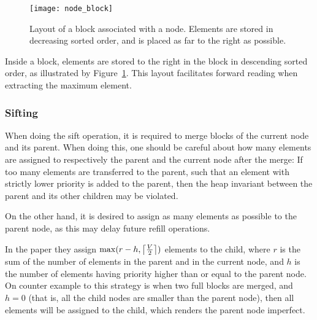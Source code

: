 \documentclass[a4paper,12pt]{article}
\DeclarePairedDelimiter{\ceil}{\lceil}{\rceil}
\begin{document}
\begin{figure}
  \centering
  \texttt{[image: node\_block]}
  \caption{Layout of a block associated with a node. Elements are
    stored in decreasing sorted order, and is placed as far to the
    right as possible.}
  \label{fig:node-block}
\end{figure}

Inside a block, elements are stored to the right in the block in
descending sorted order, as illustrated by
Figure~\ref{fig:node-block}. This layout facilitates forward reading
when extracting the maximum element.

\subsubsection{Sifting}
When doing the sift operation, it is required to merge blocks of the
current node and its parent. When doing this, one should be careful
about how many elements are assigned to respectively the parent and
the current node after the merge: If too many elements are transferred
to the parent, such that an element with strictly lower priority is
added to the parent, then the heap invariant between the parent and
its other children may be violated.

On the other hand, it is desired to assign as many elements as
possible to the parent node, as this may delay future refill
operations.

In the paper they assign $\max(r - h, \ceil*{\frac{V}{2}})$ elements to
the child, where $r$ is the sum of the number of elements in the
parent and in the current node, and $h$ is the number of elements
having priority higher than or equal to the parent node. On counter
example to this strategy is when two full blocks are merged, and $h =
0$ (that is, all the child nodes are smaller than the parent node),
then all elements will be assigned to the child, which renders the
parent node imperfect.
\end{document}
